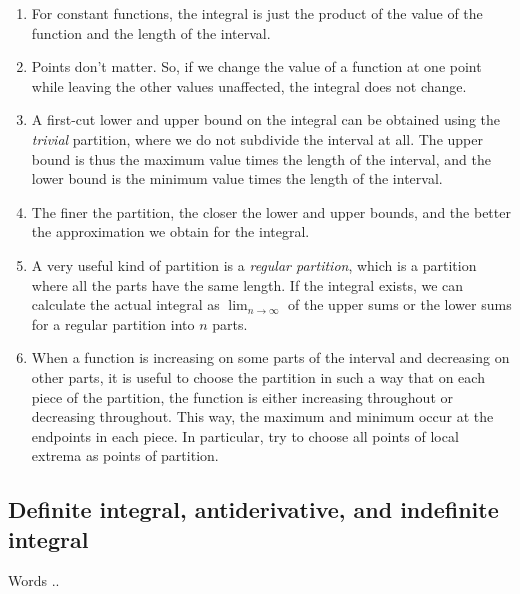 \documentclass[10pt]{amsart}
\begin{document}
\begin{enumerate}
\item For constant functions, the integral is just the product of the
  value of the function and the length of the interval.
\item Points don't matter. So, if we change the value of a function at
  one point while leaving the other values unaffected, the integral
  does not change.
\item A first-cut lower and upper bound on the integral can be
  obtained using the {\em trivial} partition, where we do not
  subdivide the interval at all. The upper bound is thus the maximum
  value times the length of the interval, and the lower bound is the
  minimum value times the length of the interval.
\item The finer the partition, the closer the lower and upper bounds,
  and the better the approximation we obtain for the integral.
\item A very useful kind of partition is a {\em regular partition},
  which is a partition where all the parts have the same length. If
  the integral exists, we can calculate the actual integral as
  $\lim_{n \to \infty}$ of the upper sums or the lower sums for a
  regular partition into $n$ parts.
\item When a function is increasing on some parts of the interval and
  decreasing on other parts, it is useful to choose the partition in
  such a way that on each piece of the partition, the function is
  either increasing throughout or decreasing throughout. This way, the
  maximum and minimum occur at the endpoints in each piece. In
  particular, try to choose all points of local extrema as points of
  partition.
\end{enumerate}

\subsection{Definite integral, antiderivative, and indefinite integral}

Words ..
\end{document}
